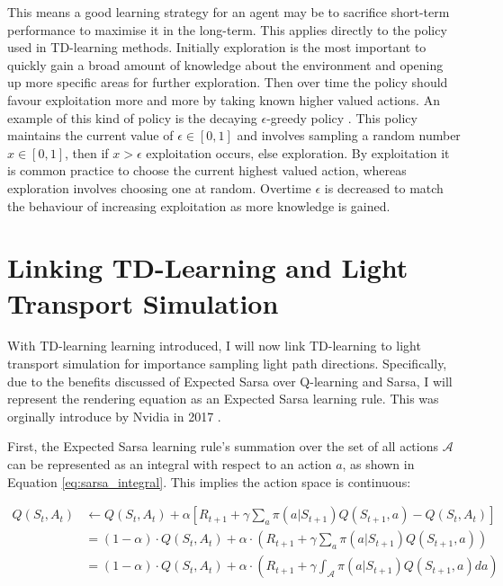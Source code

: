 \documentclass[ %
                    author={Callum Pearce},
                supervisor={Dr. Neill Campbell},
                    degree={MEng},
                     title={How effective are Temporal difference learning methods for reducing the number of zero contribution light paths, while still accurately approximating Global Illumination in Path tracing?},
                  subtitle={},
                      type={research},
                      year={2019} ]{dissertation}
\begin{document}
This means a good learning strategy for an agent may be to sacrifice short-term performance to maximise it in the long-term. This applies directly to the policy used in TD-learning methods. Initially exploration is the most important to quickly gain a broad amount of knowledge about the environment and opening up more specific areas for further exploration. Then over time the policy should favour exploitation more and more by taking known higher valued actions. An example of this kind of policy is the decaying $\epsilon$-greedy policy \cite{sutton2011reinforcement}. This policy maintains the current value of $\epsilon \in [0,1]$ and involves sampling a random number $x \in [0,1]$, then if $x > \epsilon$ exploitation occurs, else exploration. By exploitation it is common practice to choose the current highest valued action, whereas exploration involves choosing one at random. Overtime $\epsilon$ is decreased to match the behaviour of increasing exploitation as more knowledge is gained.

\section{Linking TD-Learning and Light Transport Simulation}
\label{sec:td_light_transport}
With TD-learning learning introduced, I will now link TD-learning to light transport simulation for importance sampling light path directions. Specifically, due to the benefits discussed of Expected Sarsa over Q-learning and Sarsa, I will represent the rendering equation as an Expected Sarsa learning rule. This was orginally introduce by Nvidia in 2017 \cite{dahm2017learning}. 

First, the Expected Sarsa learning rule's summation over the set of all actions $\mathcal{A}$ can be represented as an integral with respect to an action $a$, as shown in Equation \ref{eq:sarsa_integral}. This implies the action space is continuous:

\begin{align}
Q(S_t, A_t) & \leftarrow Q(S_t, A_t) + \alpha [R_{t+1} + \gamma \sum_a \pi(a| S_{t+1}) Q(S_{t+1}, a) - Q(S_t, A_t)]\\
& =  (1 - \alpha) \cdot Q(S_{t},A_t) + \alpha \cdot \left( R_{t+1} + \gamma \sum_a \pi(a|S_{t+1}) Q(S_{t+1}, a) \right)\\
& = (1 - \alpha) \cdot Q(S_{t},A_t) + \alpha \cdot \left( R_{t+1} + \gamma \int_\mathcal{A} \pi(a|S_{t+1}) Q(S_{t+1}, a) da \right)
 \label{eq:sarsa_integral}
\end{align}
\end{document}
